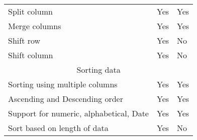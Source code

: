 \begin{table}[]
\begin{tabular}{lll}
Split column                            & Yes     & Yes     \\
Merge columns                           & Yes     & Yes     \\
Shift row                               & Yes     & No      \\
Shift column                            & Yes     & No      \\
\multicolumn{3}{c}{{\color[rgb]{0.210,0.175,0.47} Sorting data}} \\
Sorting using multiple columns          & Yes     & Yes     \\
Ascending and Descending order          & Yes     & Yes     \\
Support for numeric, alphabetical, Date & Yes     & Yes     \\
Sort based on length of data            & Yes     & No      \\
\end{tabular}
\end{table}

